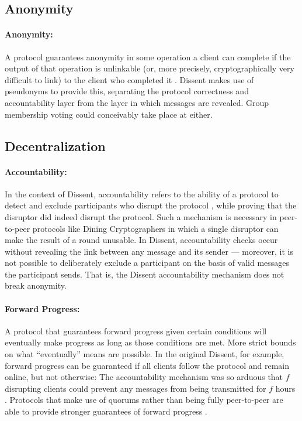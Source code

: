\subsection{Anonymity}
  \paragraph{Anonymity:} A protocol guarantees anonymity in some operation a
  client can complete if the output of that operation is unlinkable (or, more
  precisely, cryptographically very difficult to link) to the client who
  completed it \cite{corrigan-gibbs_dissent:_2010}. Dissent makes use of
  pseudonyms to provide this, separating the protocol correctness and
  accountability layer from the layer in which messages are revealed. Group
  membership voting could conceivably take place at either.

\subsection{Decentralization}
  \paragraph{Accountability:} In the context of Dissent, accountability refers
  to the ability of a protocol to detect and exclude participants who disrupt
  the protocol \cite{syta_security_2014}, while proving that the disruptor did
  indeed disrupt the protocol. Such a mechanism is necessary in peer-to-peer
  protocols like Dining Cryptographers in which a single disruptor can make
  the result of a round unusable. In Dissent, accountability checks occur
  without revealing the link between any message and its sender --- moreover,
  it is not possible to deliberately exclude a participant on the basis of
  valid messages the participant sends. That is, the Dissent accountability
  mechanism does not break anonymity.
  \paragraph{Forward Progress:} A protocol that guarantees forward progress
  given certain conditions will eventually make progress as long as those
  conditions are met. More strict bounds on what ``eventually'' means are
  possible. In the original Dissent, for example, forward progress can be
  guaranteed if all clients follow the protocol and remain online, but not
  otherwise: The accountability mechanism was so arduous that $f$ disrupting
  clients could prevent any messages from being transmitted for $f$ hours
  \cite{corrigan-gibbs_proactively_2013}. Protocols that make use of quorums
  rather than being fully peer-to-peer are able to provide stronger guarantees
  of forward progress \cite{lamport_part-time_1998}.
